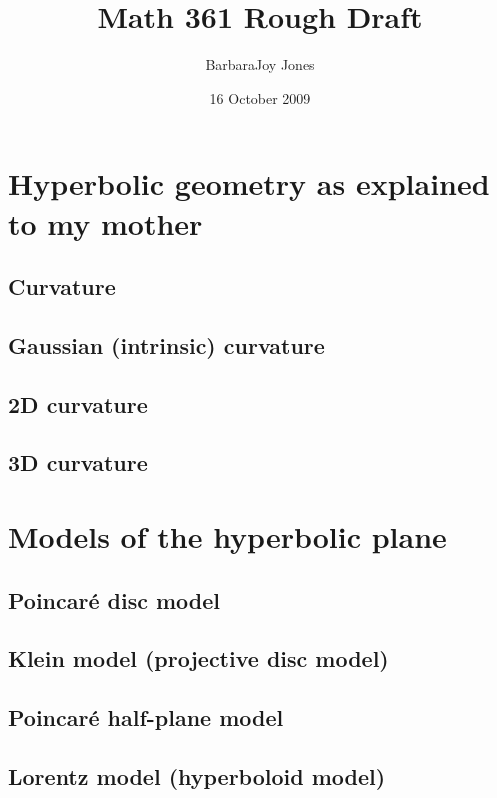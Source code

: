 \documentclass{article}
\title{Math 361 Rough Draft}
\author{BarbaraJoy Jones}
\date{16 October 2009}
\begin{document}
\maketitle

\section{Hyperbolic geometry as explained to my mother}
\subsection{Curvature}
\subsection{Gaussian (intrinsic) curvature}
\subsection{2D curvature}
\subsection{3D curvature}

\section{Models of the hyperbolic plane}
\subsection{Poincar\'e disc model}
\subsection{Klein model (projective disc model)}
\subsection{Poincar\'e half-plane model}
\subsection{Lorentz model (hyperboloid model)}
\end{document}
